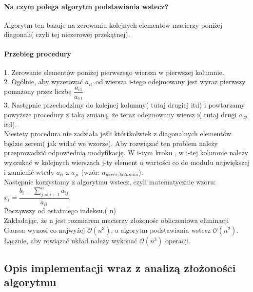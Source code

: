 \documentclass[11pt]{article}
\begin{document}
\begin{flushleft}
\paragraph{Na czym polega algorytm podstawiania wstecz?}
Algorytm ten bazuje na zerowaniu kolejnych elementów macierzy poniżej diagonali( czyli tej niezerowej przekątnej).
\paragraph{Przebieg procedury}  1. Zerowanie elementów poniżej pierwszego wiersza w pierwszej kolumnie.\\2. Ogólnie, aby wyzerować $a_{i1}$ od wiersza i-tego odejmowany jest wyraz pierwszy pomnżony przez liczbę $\dfrac{a_{i1}}{a_{11}}$ \\ 3. Następnie przechodzimy do kolejnej kolumny( tutaj drugiej itd) i powtarzamy powyższe procedury z taką zmianą, że teraz odejmowany wiersz i( tutaj drugi $a_{22}$ itd).\\
Niestety procedura nie zadziała jeśli którtkolwiek z diagonalnych elementów będzie zerem( jak widać we wzorze). Aby rozwiązać ten problem należy przeprowadzić odpowiednią modyfikację. W i-tym kroku , w i-tej kolumnie należy wyszukać w kolejnych wierszach j-ty element o wartości co do modułu największej i zamienić wtedy $a_{ii}$ z $ a_{ji}$ (wzór: $a_{wierszkolumna}$).\\Następnie korzystamy z algorytmu wstecz, czyli matematycznie wzoru: $x_i = \dfrac{b_i-\sum^n_{j=i+1} a_{ij}}{a_{ii}}$.\\ 
Począwszy od ostatniego indeksu.( n)\\
Zakładając, że n jest rozmiarem macierzy złożonośc obliczeniowa eliminacji Gaussa wynosi co najwyżej $\mathcal{O}(n^3)$, a algorytm podstawiania wstecz $\mathcal{O}(n^2)$. Łącznie, aby rowiązać układ należy wykonać $\mathcal{O}(n^3)$ operacji.
\subsection{Opis implementacji wraz z analizą złożoności algorytmu}

\end{flushleft}
\end{document}
